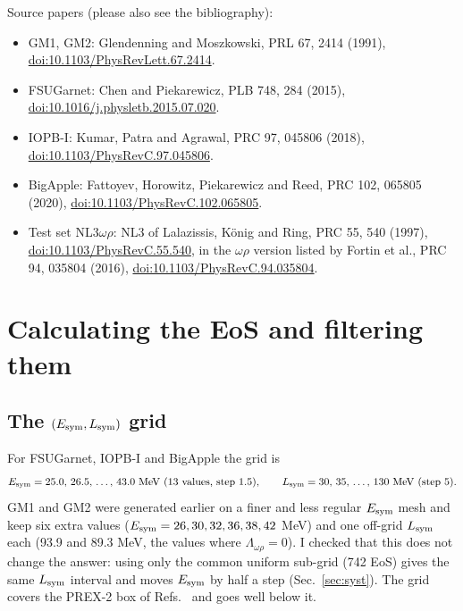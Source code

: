 \documentclass[11pt,a4paper]{article}
\newcommand{\Esym}{E_{\rm sym}}
\newcommand{\Lsym}{L_{\rm sym}}
\newcommand{\doi}[1]{\href{https://doi.org/#1}{doi:#1}}
\begin{document}
\noindent Source papers (please also see the bibliography):
\begin{itemize}
\item GM1, GM2: Glendenning and Moszkowski, PRL 67, 2414 (1991), \doi{10.1103/PhysRevLett.67.2414}.
\item FSUGarnet: Chen and Piekarewicz, PLB 748, 284 (2015), \doi{10.1016/j.physletb.2015.07.020}.
\item IOPB-I: Kumar, Patra and Agrawal, PRC 97, 045806 (2018), \doi{10.1103/PhysRevC.97.045806}.
\item BigApple: Fattoyev, Horowitz, Piekarewicz and Reed, PRC 102, 065805 (2020), \doi{10.1103/PhysRevC.102.065805}.
\item Test set NL3$\omega\rho$: NL3 of Lalazissis, K\"onig and Ring, PRC 55, 540 (1997), \doi{10.1103/PhysRevC.55.540}, in the $\omega\rho$ version listed by Fortin et al., PRC 94, 035804 (2016), \doi{10.1103/PhysRevC.94.035804}.
\end{itemize}

\section{Calculating the EoS and filtering them}\label{sec:eos}
\subsection{The $(\Esym,\Lsym)$ grid}
For FSUGarnet, IOPB-I and BigApple the grid is
\[
\Esym = 25.0,\,26.5,\,\dots,\,43.0~{\rm MeV}~(13~\text{values, step }1.5),\qquad
\Lsym = 30,\,35,\,\dots,\,130~{\rm MeV}~(\text{step }5).
\]
GM1 and GM2 were generated earlier on a finer and less regular $\Esym$ mesh and keep six extra values ($\Esym=26,30,32,36,38,42$ MeV) and one off-grid $\Lsym$ each (93.9 and 89.3 MeV, the values where $\Lambda_{\omega\rho}=0$). I checked that this does not change the answer: using only the common uniform sub-grid (742 EoS) gives the same $\Lsym$ interval and moves $\Esym$ by half a step (Sec.~\ref{sec:syst}). The grid covers the PREX-2 box of Refs.~\cite{Reed2021,Sarkar2023} and goes well below it.
\end{document}
